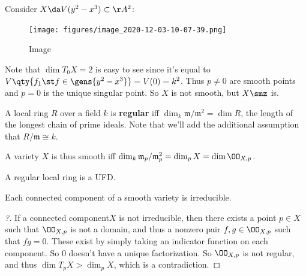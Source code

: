 \begin{example}[?]

Consider \(X\da V(y^2 - x^3) \subset \AA^2\):

\begin{figure}
\centering
\texttt{[image: figures/image\_2020-12-03-10-07-39.png]}
\caption{Image}
\end{figure}

Note that \(\dim T_0 X = 2\) is easy to see since it's equal to
\(V\qty{f_1 \st f\in \gens{y^2 - x^3}} = V(0) = k^2\). Thus \(p\neq 0\)
are smooth points and \(p=0\) is the unique singular point. So \(X\) is
not smooth, but \(X\smz\) is.

\end{example}

\begin{definition}

A local ring \(R\) over a field \(k\) is \textbf{regular} iff
\(\dim_k \mathfrak{m}/\mathfrak{m}^2 = \dim R\), the length of the
longest chain of prime ideals. Note that we'll add the additional
assumption that \(R/\mathfrak{m} \cong k\).

\end{definition}

\begin{remark}

A variety \(X\) is thus smooth iff
\(\dim_k \mathfrak{m}_p / \mathfrak{m}_p^2 = \dim_p X = \dim \OO_{X, p}\).

\end{remark}

\begin{theorem}

A regular local ring is a UFD.

\end{theorem}

\begin{corollary}[?]

Each connected component of a smooth variety is irreducible.

\end{corollary}

\begin{proof}[?]

If a connected component\(X\) is not irreducible, then there exists a
point \(p\in X\) such that \(\OO_{X, p}\) is not a domain, and thus a
nonzero pair \(f, g \in \OO_{X, p}\) such that \(fg=0\). These exist by
simply taking an indicator function on each component. So \(0\) doesn't
have a unique factorization. So \(\OO_{X, p}\) is not regular, and thus
\(\dim T_p X > \dim_p X\), which is a contradiction.

\end{proof}

